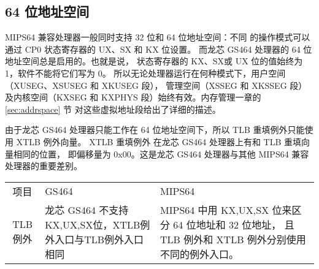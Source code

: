 \subsection{64 位地址空间}

MIPS64 兼容处理器一般同时支持 32 位和 64 位地址空间：不同
的操作模式可以通过 CP0 状态寄存器的 UX、SX 和 KX
位设置。 而龙芯 GS464 处理器的 64 位地址空间总是启用的。也就是说，
状态寄存器的 KX、SX或 UX 位的值始终为 1，软件不能将它们写为 0。
所以无论处理器运行在何种模式下，用户空间（XUSEG、XSUSEG 和 XKUSEG 段），
管理空间（XSSEG 和 XKSSEG 段）及内核空间（KXSEG 和
KXPHYS 段）始终有效。内存管理一章的 \ref{sec:addrspace} 节
对这些虚拟地址段给出了详细的描述。

由于龙芯 GS464 处理器只能工作在 64 位地址空间下，所以 TLB 重填例外只能使用 XTLB
例外向量。 XTLB 重填例外 在龙芯 GS464 处理器上有和 TLB 重填向量相同的位置，
即偏移量为 0x00。这是龙芯 GS464 处理器与其他 MIPS64 兼容处理器的重要差别。

\begin{tabular}{|c|p{6.5cm}|p{6cm}|} \hline
  项目 & GS464 & MIPS64 \\ \hhline
  TLB 例外 &
  龙芯 GS464 不支持KX,UX,SX位，XTLB例外入口与TLB例外入口相同 &
  MIPS64 中用 KX,UX,SX 位来区分 64 位地址和 32 位地址， 且 TLB 例外和 XTLB
  例外分别使用不同的例外入口。 \\ \hline 
\end{tabular}

